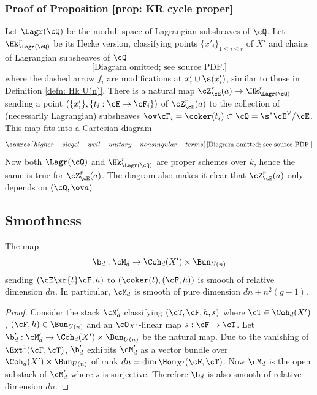 \subsubsection{Proof of Proposition \ref{prop: KR cycle proper}}\label{sssec: complete proof}
Let $\Lagr(\cQ)$ be the moduli space of Lagrangian subsheaves of $\cQ$. Let $\Hk^{r}_{\Lagr(\cQ)}$ be its Hecke version, classifying points $\{x'_{i}\}_{1\le i\le r}$ of $X'$ and chains of Lagrangian subsheaves of $\cQ$
\begin{equation}
\text{[Diagram omitted; see source PDF.]}
\end{equation}
where the dashed arrow $f_{i}$ are modifications at $x'_{i}\cup \s(x'_{i})$, similar to those in Definition \ref{defn: Hk U(n)}. There is a natural map $\cZ^{r}_{\cE}(a)\to \Hk^{r}_{\Lagr(\cQ)}$ sending a point $(\{x'_{i}\}, \{t_{i}: \cE\to \cF_{i}\})$ of $\cZ^{r}_{\cE}(a)$ to the collection of (necessarily Lagrangian) subsheaves $\ov \cF_{i}=\coker(t_{i})\subset\cQ=\s^{*}\cE^{\vee}/\cE$. This map fits into a Cartesian diagram
\begin{equation}\label{ZLag}
\source{higher-siegel-weil-unitary-nonsingular-terms}
\text{[Diagram omitted; see source PDF.]}
\end{equation}
Now both $\Lagr(\cQ)$ and $\Hk^{r}_{\Lagr(\cQ)}$ are proper schemes over $k$, hence the same is true for  $\cZ^{r}_{\cE}(a)$.  The diagram also makes it clear that $\cZ^{r}_{\cE}(a)$ only depends on $(\cQ,\ov a)$.


\subsection{Smoothness}


\begin{lemma}
\notready\label{l:Md smooth}  The map
\begin{equation}
\b_{d}: \cM_{d}\to \Coh_{d}(X')\times \Bun_{U(n)}
\end{equation}
sending $(\cE\xr{t}\cF,h)$ to $(\coker(t), (\cF,h))$ is smooth of relative dimension $dn$. In particular, $\cM_{d}$ is smooth of pure dimension $dn+n^{2}(g-1)$.
\end{lemma}
\begin{proof}
Consider the stack $\cM'_{d}$ classifying $(\cT,\cF,h, s)$ where $\cT\in \Coh_{d}(X')$, $(\cF,h)\in \Bun_{U(n)}$ and an $\cO_{X'}$-linear map $s:\cF\to \cT$. Let $\b'_{d}: \cM'_{d}\to \Coh_d(X') \times \Bun_{U(n)}$ be the natural map. Due to the vanishing of $\Ext^{1}(\cF,\cT)$, $\b'_{d}$ exhibits $\cM'_{d}$ as a vector bundle over $\Coh_d(X') \times \Bun_{U(n)}$ of rank $dn=\dim\Hom_{X'}(\cF,\cT)$. Now $\cM_{d}$ is the open substack of $\cM'_{d}$ where $s$ is surjective. Therefore $\b_{d}$ is also smooth of relative dimension $dn$.
\end{proof}



